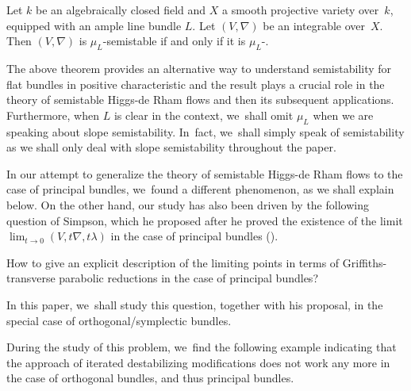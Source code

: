 \begin{thm}\label{the case of flat bundles}
Let $k$ be an algebraically closed field and $X$ a smooth projective variety over~$k$, equipped with an ample line bundle $L$. Let $(V,\nabla)$ be an integrable \lconnection over~$X$. Then $(V,\nabla)$ is $\mu_L$-semistable if and only if it is $\mu_L$-\grsemistable.
\end{thm}
The above theorem provides an alternative way to understand semistability for flat bundles in positive characteristic and the result plays a crucial role in the theory of semistable Higgs-de Rham flows \cite{LSZ19} and then its subsequent applications. Furthermore, when $L$ is clear in the context, we~shall omit $\mu_L$ when we are speaking about slope semistability. In~fact, we~shall simply speak of semistability as we shall only deal with slope semistability throughout the paper.

In our attempt to generalize the theory of semistable Higgs-de Rham flows to the case of principal bundles, we~found a different phenomenon, as we shall explain below. On the other hand, our study has also been driven by the following question of Simpson, which he proposed after he proved the existence of the limit $\lim_{t \to 0} (V, t\nabla, t\lambda)$ in the case of principal bundles (\cite[Cor.\,8.3]{S10}).
\begin{ques}[{\cite[Quest.\,8.4]{S10}}]\label{quest_simp}
How to give an explicit description of the limiting points in terms of Griffiths-transverse parabolic reductions in the case of principal bundles?
\end{ques}
In this paper, we~shall study this question, together with his proposal, in the special case of orthogonal/symplectic bundles.

During the study of this problem, we~find the following example indicating that the approach of iterated destabilizing modifications does not work any more in the case of orthogonal bundles, and thus principal bundles.

